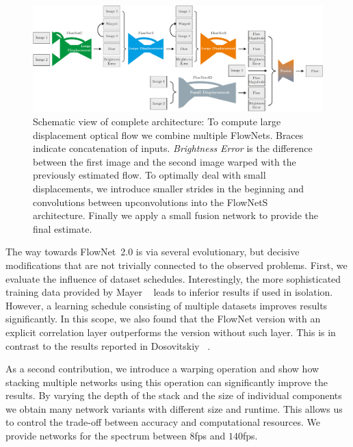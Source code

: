 \documentclass[10pt,twocolumn,letterpaper]{article}%
\begin{document}
\begin{figure}[t]
  \begin{center}
      \includegraphics[width=\linewidth]{figures/schematic.pdf}
  \end{center}
  \caption{Schematic view of complete architecture: To compute large displacement optical flow we combine multiple FlowNets. Braces indicate concatenation of inputs. \textit{Brightness Error} is the difference between the first image and the second image warped with the previously estimated flow. 
  To optimally deal with small displacements, we introduce smaller strides in the beginning and convolutions between upconvolutions into the FlowNetS architecture. Finally we apply a small fusion network to provide the final estimate. 
  }
  \label{fig:schematic}
\end{figure}%

The way towards FlowNet~2.0 is via several evolutionary, but decisive modifications that are not trivially connected to the observed problems. First, we evaluate the influence of dataset schedules. Interestingly, the more sophisticated training data provided by Mayer \etal~\cite{MIFDB16} leads to inferior results if used in isolation. However, a learning schedule consisting of multiple datasets improves results significantly. In this scope, we also found that the FlowNet version with an explicit correlation layer outperforms the version without such layer. This is in contrast to the results reported in Dosovitskiy \etal~\cite{DFIB15}. 

As a second contribution, we introduce a warping operation and show how stacking multiple networks using this operation can significantly improve the results. 
By varying the depth of the stack and the size of individual components we obtain
many network variants with different size and runtime. This allows us to control the trade-off between accuracy and computational resources. We provide networks for the spectrum between $8$fps and $140$fps. 
\end{document}
